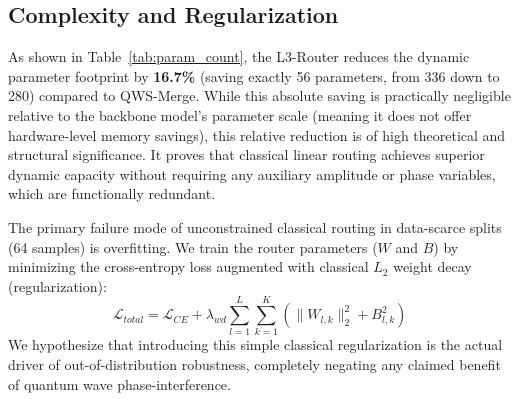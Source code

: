 \subsection{Complexity and Regularization}
As shown in Table~\ref{tab:param_count}, the L3-Router reduces the dynamic parameter footprint by \textbf{16.7\%} (saving exactly 56 parameters, from 336 down to 280) compared to QWS-Merge. While this absolute saving is practically negligible relative to the backbone model's parameter scale (meaning it does not offer hardware-level memory savings), this relative reduction is of high theoretical and structural significance. It proves that classical linear routing achieves superior dynamic capacity without requiring any auxiliary amplitude or phase variables, which are functionally redundant. 

The primary failure mode of unconstrained classical routing in data-scarce splits (64 samples) is overfitting. We train the router parameters ($W$ and $B$) by minimizing the cross-entropy loss augmented with classical $L_2$ weight decay (regularization):
\begin{equation}
    \mathcal{L}_{total} = \mathcal{L}_{CE} + \lambda_{wd} \sum_{l=1}^L \sum_{k=1}^K \left( \|W_{l, k}\|_2^2 + B_{l, k}^2 \right)
\end{equation}
We hypothesize that introducing this simple classical regularization is the actual driver of out-of-distribution robustness, completely negating any claimed benefit of quantum wave phase-interference.

